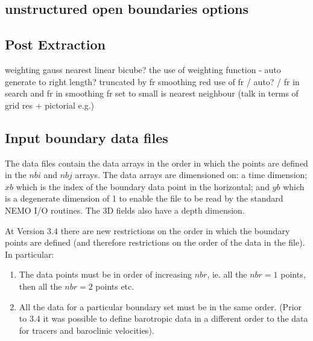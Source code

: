\subsection{unstructured open boundaries options}
\label{bdyopts}




\subsection{Post Extraction}
\label{pe}

weighting gauss nearest linear bicube?
the use of weighting function - auto generate to right length? truncated by fr smoothing red
use of fr / auto? /
fr in search and fr in smoothing
fr set to small is nearest neighbour (talk in terms of grid res + pictorial e.g.)






\subsection{Input boundary data files}
\label{BDY_data}

The data files contain the data arrays
in the order in which the points are defined in the $nbi$ and
$nbj$
arrays. The data arrays are dimensioned on: a time dimension;
$xb$ which is the index of the boundary data point in the
horizontal;
and $yb$ which is a degenerate dimension of 1 to enable the file
to be
read by the standard NEMO I/O routines. The 3D fields also have
a
depth dimension.

At Version 3.4 there are new restrictions on the order in which
the
boundary points are defined (and therefore restrictions on the
order
of the data in the file). In particular:

\mbox{}

\begin{enumerate}
\item The data points must be in order of increasing $nbr$, ie.
all
  the $nbr=1$ points, then all the $nbr=2$ points etc.
\item All the data for a particular boundary set must be in the
same
order. (Prior to 3.4 it was possible to define barotropic data
in a
different order to the data for tracers and baroclinic
velocities).
\end{enumerate}

